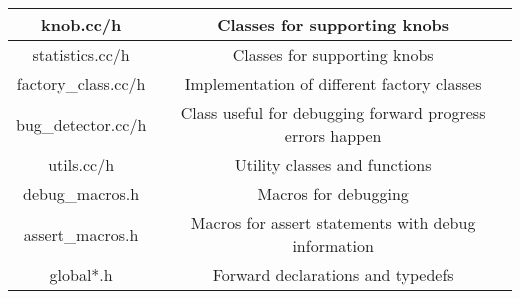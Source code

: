 \begin{table}[htb]
\begin{footnotesize}
\begin{center}
\begin{tabular}{|c||c|}
knob.cc/h                                                    & Classes for supporting knobs       \\ \hline
statistics.cc/h                                              & Classes for supporting knobs       \\ \hline
factory\_class.cc/h                                          & Implementation of different factory classes                          \\ \hline
bug\_detector.cc/h                                           & Class useful for debugging forward progress errors happen             \\ \hline
utils.cc/h                                                   & Utility classes and functions      \\ \hline
debug\_macros.h                                              & Macros for debugging               \\ \hline
assert\_macros.h                                             & Macros for assert statements with debug information                  \\ \hline
global*.h                                                    & Forward declarations and typedefs  \\ \hline

\end{tabular}
\end{center}
\end{footnotesize}
\end{table}



